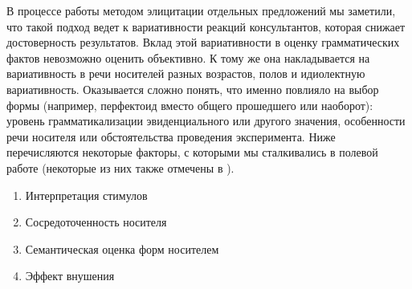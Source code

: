 \par В процессе работы методом элицитации отдельных предложений мы заметили, что такой подход ведет к вариативности реакций консультантов, которая снижает достоверность результатов. Вклад этой вариативности в оценку грамматических фактов невозможно оценить объективно. К тому же она накладывается на вариативность в речи носителей разных возрастов, полов и идиолектную вариативность. Оказывается сложно понять, что именно повлияло на выбор формы (например, перфектоид вместо общего прошедшего или наоборот): уровень грамматикализации эвиденциального или другого значения, особенности речи носителя или обстоятельства проведения эксперимента. Ниже перечисляются некоторые факторы, с которыми мы сталкивались в полевой работе \color{purple} (некоторые из них также отмечены в \citep{kibrik1972}).

\begin{enumerate}
    \item Интерпретация стимулов
    \item Сосредоточенность носителя
    \item Семантическая оценка форм носителем
    \item Эффект внушения
\end{enumerate}

